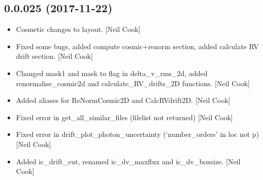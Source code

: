 \documentclass[a4paper,10pt,english]{report}
\begin{document}
\subsection{0.0.025 (2017-11-22)}
\label{\detokenize{misc/changelog:id525}}\begin{itemize}
\item {} 
Cosmetic changes to layout. {[}Neil Cook{]}

\item {} 
Fixed some bugs, added compute cosmic+renorm section, added calculate
RV drift section. {[}Neil Cook{]}

\item {} 
Changed mask1 and mask to flag in delta\_v\_rms\_2d, added
renormalise\_cosmic2d and calculate\_RV\_drifts\_2D functions. {[}Neil Cook{]}

\item {} 
Added aliases for ReNormCosmic2D and CalcRVdrift2D. {[}Neil Cook{]}

\item {} 
Fixed error in get\_all\_similar\_files (filelist not returned) {[}Neil
Cook{]}

\item {} 
Fixed error in drift\_plot\_photon\_uncertainty (‘number\_orders’ in loc
not p) {[}Neil Cook{]}

\item {} 
Added ic\_drift\_cut, renamed ic\_dv\_maxflux and ic\_dv\_boxsize. {[}Neil
Cook{]}

\end{itemize}
\end{document}
